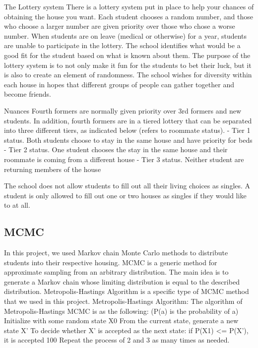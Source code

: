 \documentclass[11pt]{article}
\begin{document}
The Lottery system
There is a lottery system put in place to help your chances of obtaining the house you want. Each student chooses a random number, and those who choose a larger number are given priority over those who chose a worse number. When students are on leave (medical or otherwise) for a year, students are unable to participate in the lottery. The school identifies what would be a good fit for the student based on what is known about them. 
The purpose of the lottery system is to not only make it fun for the students to bet their luck, but it is also to create an element of randomness. The school wishes for diversity within each house in hopes that different groups of people can gather together and become friends.

Nuances
Fourth formers are normally given priority over 3rd formers and new students. In addition, fourth formers are in a tiered lottery that can be separated into three different tiers, as indicated below (refers to roommate status).
- Tier 1 status. Both students choose to stay in the same house and have priority for beds
- Tier 2 status. One student chooses the stay in the same house and their roommate is coming from a different house
- Tier 3 status. Neither student are returning members of the house

The school does not allow students to fill out all their living choices as singles. A student is only allowed to fill out one or two houses as singles if they would like to at all.

\subsection{MCMC}
\label{sec:orga95e088}

In this project, we used Markov chain Monte Carlo methods to distribute students into their respective housing. MCMC is a generic method for approximate sampling from an arbitrary distribution. The main idea is to generate a Markov chain whose limiting distribution is equal to the described distribution.
Metropolis-Hastings Algorithm is a specific type of MCMC method that we used in this project.
Metropolis-Hastings Algorithm:
The algorithm of Metropolis-Hastings MCMC is as the following: (P(a) is the probability of a)
Initialize with some random state X0
From the current state, generate a new state X’
To decide whether X’ is accepted as the next state: if P(X1) <= P(X’), it is accepted 100%
Repeat the process of 2 and 3 as many times as needed.
\end{document}
